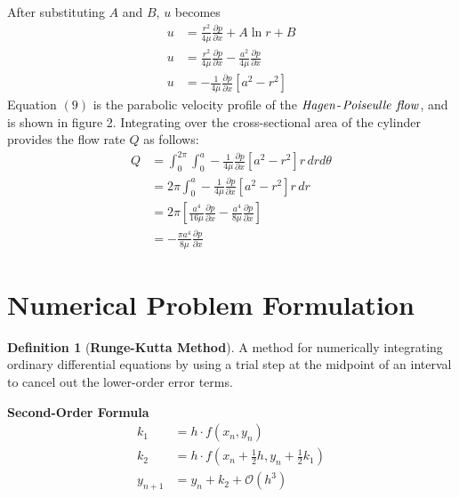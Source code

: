 \documentclass[12pt, a4paper]{article}
\theoremstyle{plain}
\theoremstyle{definition}
\newtheorem{definition}{Definition}[section]
\theoremstyle{remark}
\begin{document}
After substituting $A$ and $B$, $u$ becomes
\begin{align}
u  &= \frac{r^2}{4\mu} \frac{\partial p}{\partial x} + A\ln{r} + B  \\
u  &= \frac{r^2}{4\mu} \frac{\partial p}{\partial x} - \frac{a^2}{4\mu} \frac{\partial p}{\partial x}  \\
u  &= - \frac{1}{4\mu} \frac{\partial p}{\partial x} \left[  a^2-r^2        \right]
\end{align}
Equation $(9)$ is the parabolic velocity profile of the $\it{Hagen}$-$\it{Poiseulle}$ $\it{flow}$, and is shown in figure 2. Integrating over the cross-sectional area of the cylinder provides the flow rate $Q$ as follows: 
\begin{align}
Q &= \int_0^{2\pi} \int_0^a - \frac{1}{4\mu} \frac{\partial p}{\partial x} \left[  a^2-r^2        \right] r \, drd\theta\\
    &= 2\pi \int_0^a - \frac{1}{4\mu} \frac{\partial p}{\partial x} \left[  a^2-r^2        \right] r \, dr\\
    &= 2\pi \left[ \frac{a^4}{16\mu}\frac{\partial p}{\partial x}-\frac{a^4}{8\mu}\frac{\partial p}{\partial x} \right]\\
    &=- \frac{\pi a^4}{8\mu} \frac{\partial p}{\partial x} 
\end{align}


\newpage




\section{Numerical Problem Formulation}

\begin{definition}[\bf{Runge-Kutta Method}]
A method for numerically integrating ordinary differential equations by using a trial step at the midpoint of an interval to cancel out the lower-order error terms.
\end{definition}

\textbf{Second-Order Formula}
\begin{align*}
{k}_{1} &= h\cdot f({x}_{n}, {y}_{n})\\
{k}_{2} &= h \cdot f \left( {x}_{n} + \frac{1}{2} h, {y}_{n} + \frac{1}{2} {k}_{1} \right)\\
{y}_{n+1} &= {y}_{n} + {k}_{2} + \mathcal{O} \left( {h}^{3} \right)\\
\end{align*}
\end{document}

